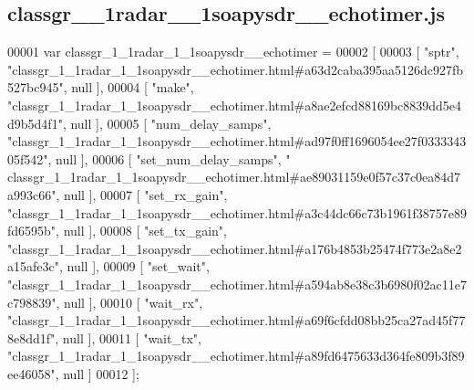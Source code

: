 \subsection{classgr\+\_\+\_\+1radar\+\_\+\_\+1soapysdr\+\_\+\+\_\+echotimer.\+js}
\label{classgr__1__1radar__1__1soapysdr____echotimer_8js_source}

\begin{DoxyCode}
00001 var classgr_1_1radar_1_1soapysdr__echotimer =
00002 [
00003     [ \textcolor{stringliteral}{"sptr"}, \textcolor{stringliteral}{"classgr\_1\_1radar\_1\_1soapysdr\_\_echotimer.html#a63d2caba395aa5126dc927fb527bc945"}, null ],
00004     [ \textcolor{stringliteral}{"make"}, \textcolor{stringliteral}{"classgr\_1\_1radar\_1\_1soapysdr\_\_echotimer.html#a8ae2efcd88169bc8839dd5e4d9b5d4f1"}, null ],
00005     [ \textcolor{stringliteral}{"num\_delay\_samps"}, \textcolor{stringliteral}{"classgr\_1\_1radar\_1\_1soapysdr\_\_echotimer.html#ad97f0ff1696054ee27f033334305f542"}, 
      null ],
00006     [ \textcolor{stringliteral}{"set\_num\_delay\_samps"}, \textcolor{stringliteral}{"
      classgr\_1\_1radar\_1\_1soapysdr\_\_echotimer.html#ae89031159e0f57c37c0ea84d7a993c66"}, null ],
00007     [ \textcolor{stringliteral}{"set\_rx\_gain"}, \textcolor{stringliteral}{"classgr\_1\_1radar\_1\_1soapysdr\_\_echotimer.html#a3c44dc66c73b1961f38757e89fd6595b"}, null
       ],
00008     [ \textcolor{stringliteral}{"set\_tx\_gain"}, \textcolor{stringliteral}{"classgr\_1\_1radar\_1\_1soapysdr\_\_echotimer.html#a176b4853b25474f773e2a8e2a15afe3c"}, null
       ],
00009     [ \textcolor{stringliteral}{"set\_wait"}, \textcolor{stringliteral}{"classgr\_1\_1radar\_1\_1soapysdr\_\_echotimer.html#a594ab8e38c3b6980f02ac11e7c798839"}, null ],
00010     [ \textcolor{stringliteral}{"wait\_rx"}, \textcolor{stringliteral}{"classgr\_1\_1radar\_1\_1soapysdr\_\_echotimer.html#a69f6cfdd08bb25ca27ad45f778e8dd1f"}, null ],
00011     [ \textcolor{stringliteral}{"wait\_tx"}, \textcolor{stringliteral}{"classgr\_1\_1radar\_1\_1soapysdr\_\_echotimer.html#a89fd6475633d364fe809b3f89ee46058"}, null ]
00012 ];
\end{DoxyCode}
